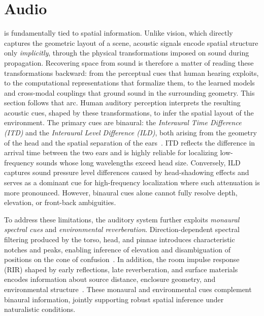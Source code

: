 \section{Audio}
\label{sec:rep_audio}



 is fundamentally tied to spatial information. 
Unlike vision, which directly captures the geometric layout of a scene, acoustic signals encode spatial structure only \emph{implicitly}, through the physical transformations imposed on sound during propagation.
Recovering space from sound is therefore a matter of reading these transformations backward: from the perceptual cues that human hearing exploits, to the computational representations that formalize them, to the learned models and cross-modal couplings that ground sound in the surrounding geometry. 
This section follows that arc.
Human auditory perception interprets the resulting acoustic cues, shaped by these transformations, to infer the spatial layout of the environment.
The primary cues are binaural: the \emph{Interaural Time Difference (ITD)} and the \emph{Interaural Level Difference (ILD)}, both arising from the geometry of the head and the spatial separation of the ears~\cite{macpherson2002listener,middlebrooks2015sound}.
ITD reflects the difference in arrival time between the two ears and is highly reliable for localizing low-frequency sounds whose long wavelengths exceed head size.
Conversely, ILD captures sound pressure level differences caused by head-shadowing effects and serves as a dominant cue for high-frequency localization where such attenuation is more pronounced.
However, binaural cues alone cannot fully resolve depth, elevation, or front-back ambiguities.

To address these limitations, the auditory system further exploits \emph{monaural spectral cues} and \emph{environmental reverberation}.
Direction-dependent spectral filtering produced by the torso, head, and pinnae introduces characteristic notches and peaks, enabling inference of elevation and disambiguation of positions on the cone of confusion~\cite{gardner19983}.
In addition, the room impulse response (RIR) shaped by early reflections, late reverberation, and surface materials encodes information about source distance, enclosure geometry, and environmental structure~\cite{kuttruff2016room,blauert1997spatial}.
These monaural and environmental cues complement binaural information, jointly supporting robust spatial inference under naturalistic conditions.

